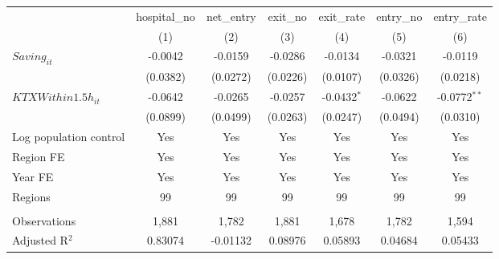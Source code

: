 \begingroup
\centering
\begin{tabular}{lcccccc}
   \toprule
                          & hospital\_no  & net\_entry  & exit\_no  & exit\_rate    & entry\_no  & entry\_rate \\    
                          & (1)           & (2)         & (3)       & (4)           & (5)        & (6)\\  
   \midrule 
   $Saving_{it}$          & -0.0042       & -0.0159     & -0.0286   & -0.0134       & -0.0321    & -0.0119\\   
                          & (0.0382)      & (0.0272)    & (0.0226)  & (0.0107)      & (0.0326)   & (0.0218)\\   
   $KTXWithin1.5h_{it}$   & -0.0642       & -0.0265     & -0.0257   & -0.0432$^{*}$ & -0.0622    & -0.0772$^{**}$\\   
                          & (0.0899)      & (0.0499)    & (0.0263)  & (0.0247)      & (0.0494)   & (0.0310)\\   
   Log population control & Yes           & Yes         & Yes       & Yes           & Yes        & Yes\\  
   Region FE              & Yes           & Yes         & Yes       & Yes           & Yes        & Yes\\  
   Year FE                & Yes           & Yes         & Yes       & Yes           & Yes        & Yes\\  
   Regions                & 99            & 99          & 99        & 99            & 99         & 99\\  
    \\
   Observations           & 1,881         & 1,782       & 1,881     & 1,678         & 1,782      & 1,594\\  
   Adjusted R$^2$         & 0.83074       & -0.01132    & 0.08976   & 0.05893       & 0.04684    & 0.05433\\  
   \bottomrule
\end{tabular}
\par\endgroup
